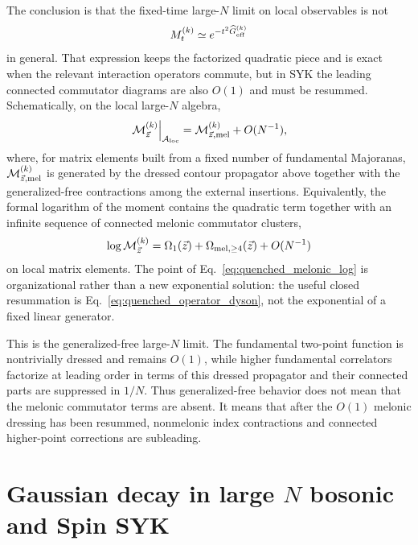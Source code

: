 \documentclass{article}
\theoremstyle{definition}
\begin{document}
The conclusion is that the fixed-time large-$N$ limit on local observables is not
\begin{equation}
    M_t^{(k)}\simeq e^{-t^2\widehat G_{\rm eff}^{(k)}}
\end{equation}
in general. That expression keeps the factorized quadratic piece and is exact when the relevant interaction operators commute, but in SYK the leading connected commutator diagrams are also $O(1)$ and must be resummed. Schematically, on the local large-$N$ algebra,
\begin{equation}
    \left.{\cal M}_{\vec z}^{(k)}\right|_{{\cal A}_{\rm loc}}
    ={\cal M}_{\vec z,{\rm mel}}^{(k)}+O(N^{-1}),
    \label{eq:quenched_melonic_moment}
\end{equation}
where, for matrix elements built from a fixed number of fundamental Majoranas, ${\cal M}_{\vec z,{\rm mel}}^{(k)}$ is generated by the dressed contour propagator above together with the generalized-free contractions among the external insertions. Equivalently, the formal logarithm of the moment contains the quadratic term together with an infinite sequence of connected melonic commutator clusters,
\begin{equation}
    \log {\cal M}_{\vec z}^{(k)}
    =\Omega_1(\vec z)
    +\Omega_{{\rm mel},\geq4}(\vec z)
    +O(N^{-1})
    \label{eq:quenched_melonic_log}
\end{equation}
on local matrix elements. The point of Eq.~\eqref{eq:quenched_melonic_log} is organizational rather than a new exponential solution: the useful closed resummation is Eq.~\eqref{eq:quenched_operator_dyson}, not the exponential of a fixed linear generator.

This is the generalized-free large-$N$ limit. The fundamental two-point function is nontrivially dressed and remains $O(1)$, while higher fundamental correlators factorize at leading order in terms of this dressed propagator and their connected parts are suppressed in $1/N$. Thus generalized-free behavior does not mean that the melonic commutator terms are absent. It means that after the $O(1)$ melonic dressing has been resummed, nonmelonic index contractions and connected higher-point corrections are subleading.



\section{Gaussian decay in large $N$ bosonic and Spin SYK}
\label{sec:bosonic_spin_syk_gaussian_regulator}
\end{document}
